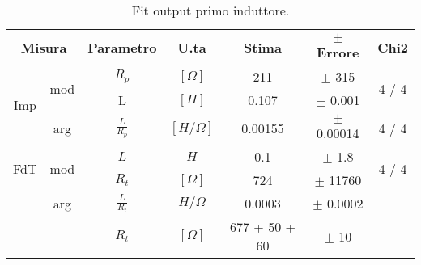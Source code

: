 \begin{table}[H]
\begin{center}
\begin{tabular}{|c|c|c|c|c|c|c|}
\hline

\multicolumn{2}{|c|}{Misura}  & Parametro   & U.ta & Stima & $\pm$ Errore & Chi2    \\ \hline

\multirow{ 3}{*}{Imp}
& \multirow{ 2}{*}{mod} & $R_{p}$ &  $[\Omega]$    
&  211 & $\pm$ 315 & \multirow{ 2}{*}{ 4 / 4 }     \\ 

&  & L  & $[H]$     
&   0.107 & $\pm$    0.001 &      \\

& arg & $ \tfrac{L}{R_{p}} $ & $[H / \Omega]$
& 0.00155 & $\pm$ 0.00014 &  4 / 4    \\ \hline


\multirow{ 2}{*}{FdT}
& \multirow{ 2}{*}{mod}
& $L$ & $ H $     
& 0.1  & $\pm$ 1.8     & \multirow{ 2}{*}{ 4 / 4 }  \\ 

& & $R_{t}$ & $[\Omega] $ 
& 724     & $\pm$ 11760 &      \\

& arg & $ \tfrac{L}{R_{t}} $ & $ H / \Omega $ 
& 0.0003  & $\pm$  0.0002 &      \\

\multicolumn{2}{|c|}{}  & $R_{t}$ & $[\Omega]$  
& 677 + 50 + 60  & $\pm$  10 &       \\ \hline

\end{tabular}

\label{C3_P1_fit_cond1}

\caption{
Fit output primo induttore.
}

\end{center}

\end{table}